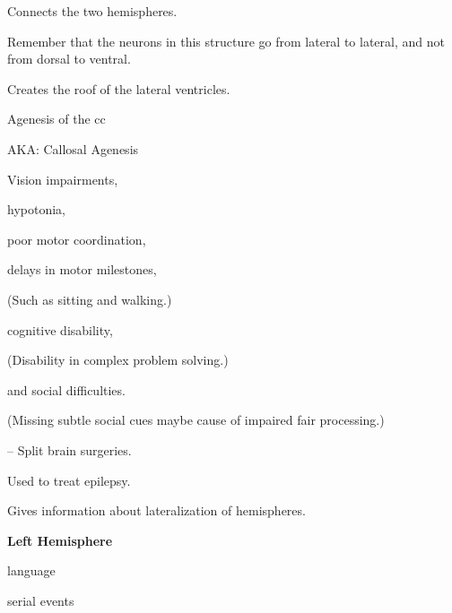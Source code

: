 \begin{coloredlist}
\item {}
\begin{coloredlist}
    \item Connects the two hemispheres.
    \item Remember that the neurons in this structure go from lateral to lateral, and not from dorsal to ventral.
    \item Creates the roof of the lateral ventricles.
    \item Agenesis of the cc
    \begin{coloredlist}
        \item AKA: Callosal Agenesis
        \item Vision impairments,
        \item hypotonia,
        \item poor motor coordination,
        \item delays in motor milestones,
        \begin{coloredlist}
            \item (Such as sitting and walking.)
        \end{coloredlist}
        \item cognitive disability,
        \begin{coloredlist}
            \item (Disability in complex problem solving.)
        \end{coloredlist}
        \item and social difficulties.
        \begin{coloredlist}
            \item (Missing subtle social cues maybe cause of impaired fair processing.)
        \end{coloredlist}
    \end{coloredlist}
    \item {} -- Split brain surgeries.
    \begin{coloredlist}
        \item Used to treat epilepsy.
        \item Gives information about lateralization of hemispheres.
        \item \textbf{Left Hemisphere}
        \begin{coloredlist}
            \item language
            \item serial events

\end{coloredlist}
\end{coloredlist}
\end{coloredlist}
\end{coloredlist}
